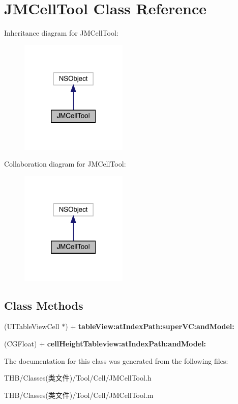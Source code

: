 \hypertarget{interface_j_m_cell_tool}{}\section{J\+M\+Cell\+Tool Class Reference}
\label{interface_j_m_cell_tool}


Inheritance diagram for J\+M\+Cell\+Tool\+:\nopagebreak
\begin{figure}[H]
\begin{center}
\leavevmode
\includegraphics[width=145pt]{interface_j_m_cell_tool__inherit__graph}
\end{center}
\end{figure}


Collaboration diagram for J\+M\+Cell\+Tool\+:\nopagebreak
\begin{figure}[H]
\begin{center}
\leavevmode
\includegraphics[width=145pt]{interface_j_m_cell_tool__coll__graph}
\end{center}
\end{figure}
\subsection*{Class Methods}
\begin{DoxyCompactItemize}
\item 
\mbox{\label{interface_j_m_cell_tool_a23ca959057f22e58149a1b53e49ba14e}} 
(U\+I\+Table\+View\+Cell $\ast$) + {\bfseries table\+View\+:at\+Index\+Path\+:super\+V\+C\+:and\+Model\+:}
\item 
\mbox{\label{interface_j_m_cell_tool_a6a899f65ee406cc28896bc338d3fb0a9}} 
(C\+G\+Float) + {\bfseries cell\+Height\+Tableview\+:at\+Index\+Path\+:and\+Model\+:}
\end{DoxyCompactItemize}


The documentation for this class was generated from the following files\+:\begin{DoxyCompactItemize}
\item 
T\+H\+B/\+Classes(类文件)/\+Tool/\+Cell/J\+M\+Cell\+Tool.\+h\item 
T\+H\+B/\+Classes(类文件)/\+Tool/\+Cell/J\+M\+Cell\+Tool.\+m\end{DoxyCompactItemize}
